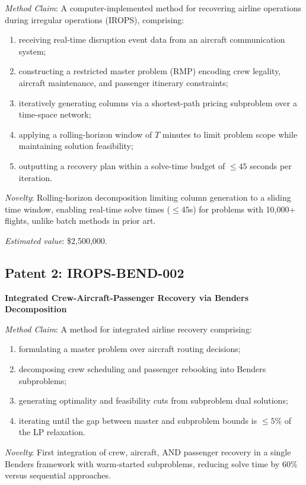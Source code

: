 \documentclass[11pt,a4paper]{book}
\theoremstyle{definition}
\begin{document}
\textit{Method Claim}: A computer-implemented method for recovering airline
operations during irregular operations (IROPS), comprising:
\begin{enumerate}
  \item receiving real-time disruption event data from an aircraft
    communication system;
  \item constructing a restricted master problem (RMP) encoding crew
    legality, aircraft maintenance, and passenger itinerary constraints;
  \item iteratively generating columns via a shortest-path pricing
    subproblem over a time-space network;
  \item applying a rolling-horizon window of $T$ minutes to limit
    problem scope while maintaining solution feasibility;
  \item outputting a recovery plan within a solve-time budget of
    $\leq 45$ seconds per iteration.
\end{enumerate}

\textit{Novelty}: Rolling-horizon decomposition limiting column generation to
a sliding time window, enabling real-time solve times ($\leq 45$s) for
problems with 10,000+ flights, unlike batch methods in prior art.

\textit{Estimated value}: \$2,500,000.

\subsection{Patent 2: IROPS-BEND-002}
\textbf{Integrated Crew-Aircraft-Passenger Recovery via Benders Decomposition}

\textit{Method Claim}: A method for integrated airline recovery comprising:
\begin{enumerate}
  \item formulating a master problem over aircraft routing decisions;
  \item decomposing crew scheduling and passenger rebooking into
    Benders subproblems;
  \item generating optimality and feasibility cuts from subproblem
    dual solutions;
  \item iterating until the gap between master and subproblem bounds
    is $\leq 5\%$ of the LP relaxation.
\end{enumerate}

\textit{Novelty}: First integration of crew, aircraft, AND passenger recovery
in a single Benders framework with warm-started subproblems, reducing
solve time by 60\% versus sequential approaches.
\end{document}
